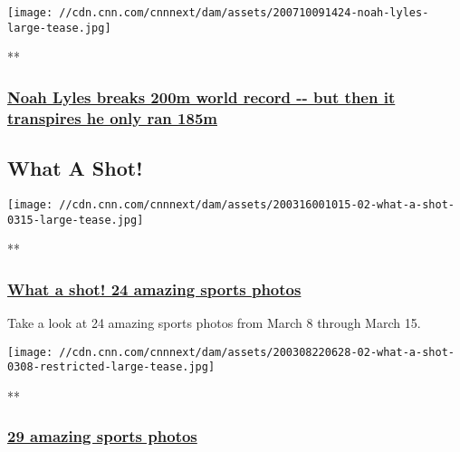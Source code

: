 \href{/videos/sports/2020/07/10/noah-lyles-inspiration-games-200m-zurich-diamond-league-spt-intl-lon-orig.cnn}{}

\texttt{[image: //cdn.cnn.com/cnnnext/dam/assets/200710091424-noah-lyles-large-tease.jpg]}

**

\hypertarget{noah-lyles-breaks-200m-world-record----but-then-it-transpires-he-only-ran-185m}{%
\subsubsection{\texorpdfstring{\href{/videos/sports/2020/07/10/noah-lyles-inspiration-games-200m-zurich-diamond-league-spt-intl-lon-orig.cnn}{Noah
Lyles breaks 200m world record -\/- but then it transpires he only ran
185m}}{Noah Lyles breaks 200m world record -\/- but then it transpires he only ran 185m}}\label{noah-lyles-breaks-200m-world-record----but-then-it-transpires-he-only-ran-185m}}

\hypertarget{what-a-shot-}{%
\subsection{What A Shot!~}\label{what-a-shot-}}

\href{/2020/03/16/sport/gallery/what-a-shot-sports-0315/index.html}{}

\texttt{[image: //cdn.cnn.com/cnnnext/dam/assets/200316001015-02-what-a-shot-0315-large-tease.jpg]}

**

\hypertarget{what-a-shot-24-amazing-sports-photos}{%
\subsubsection{\texorpdfstring{\href{/2020/03/16/sport/gallery/what-a-shot-sports-0315/index.html}{What
a shot! 24 amazing sports
photos}}{What a shot! 24 amazing sports photos}}\label{what-a-shot-24-amazing-sports-photos}}

Take a look at 24 amazing sports photos from March 8 through March 15.

\href{/2020/03/09/sport/gallery/what-a-shot-sports-0308/index.html}{}

\texttt{[image: //cdn.cnn.com/cnnnext/dam/assets/200308220628-02-what-a-shot-0308-restricted-large-tease.jpg]}

**

\hypertarget{29-amazing-sports-photos}{%
\subsubsection{\texorpdfstring{\href{/2020/03/09/sport/gallery/what-a-shot-sports-0308/index.html}{29
amazing sports
photos}}{29 amazing sports photos}}\label{29-amazing-sports-photos}}

